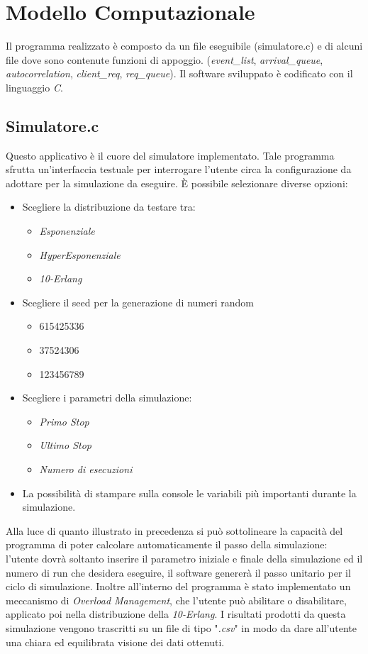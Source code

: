 \chapter{Modello Computazionale}
Il programma realizzato è composto da un file eseguibile (simulatore.c) e di alcuni file dove sono contenute funzioni di appoggio. (\textit{event\_list}, \textit{arrival\_queue}, \textit{autocorrelation}, \textit{client\_req}, \textit{req\_queue}).
Il software sviluppato è codificato con il linguaggio \textit{C}.

\section{Simulatore.c}

Questo applicativo è il cuore del simulatore implementato. Tale programma sfrutta un'interfaccia testuale per interrogare l'utente circa la configurazione da adottare per la simulazione da eseguire. 
È possibile selezionare diverse opzioni:
\begin{itemize}
\item Scegliere la distribuzione da testare tra:
\begin{itemize}
\item \textit{Esponenziale}
\item \textit{HyperEsponenziale}
\item \textit{10-Erlang}
\end{itemize}
\item Scegliere il seed per la generazione di numeri random
\begin{itemize}
\item 615425336
\item 37524306
\item 123456789
\end{itemize}
\item Scegliere i parametri della simulazione:
\begin{itemize}
\item \textit{Primo Stop}
\item \textit{Ultimo Stop}
\item \textit{Numero di esecuzioni}
\end{itemize}
\item La possibilità di stampare sulla console le variabili più importanti durante la simulazione.
\end{itemize}

Alla luce di quanto illustrato in precedenza si può sottolineare la capacità del programma di poter calcolare automaticamente il passo della simulazione: l'utente dovrà soltanto inserire il parametro iniziale e finale della simulazione ed il numero di run che desidera eseguire, il software genererà il passo unitario per il ciclo di simulazione.
Inoltre all'interno del programma è stato implementato un meccanismo di \textit{Overload Management}, che l'utente può abilitare o disabilitare, applicato poi nella distribuzione della \textit{10-Erlang}.
I risultati prodotti da questa simulazione vengono trascritti su un file di tipo "\textit{.csv}"  in modo da dare all'utente una chiara ed equilibrata visione dei dati ottenuti.

